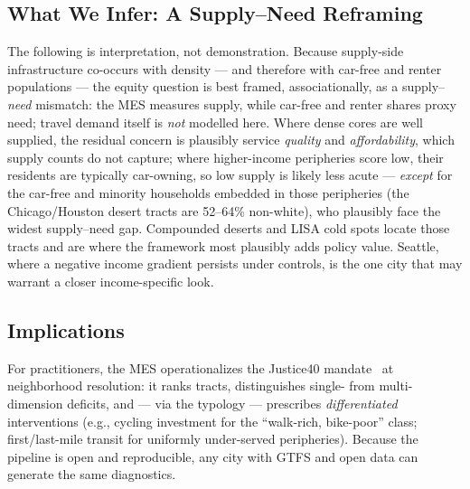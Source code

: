 \documentclass[11pt]{article}
\begin{document}
\subsection{What We Infer: A Supply--Need Reframing}
The following is interpretation, not demonstration. Because supply-side
infrastructure co-occurs with density --- and therefore with car-free and renter
populations --- the equity question is best framed, associationally, as a
supply--\emph{need} mismatch: the MES measures supply, while car-free and renter
shares proxy need; travel demand itself is \emph{not} modelled here. Where dense
cores are well supplied, the residual concern is plausibly service \emph{quality}
and \emph{affordability}, which supply counts do not capture; where higher-income
peripheries score low, their residents are typically car-owning, so low supply is
likely less acute --- \emph{except} for the car-free and minority households
embedded in those peripheries (the Chicago/Houston desert tracts are 52--64\%
non-white), who plausibly face the widest supply--need gap. Compounded deserts and
LISA cold spots locate those tracts and are where the framework most plausibly
adds policy value. Seattle, where a negative income gradient persists under
controls, is the one city that may warrant a closer income-specific look.

\subsection{Implications}
For practitioners, the MES operationalizes the Justice40 mandate~\cite{argonne2022}
at neighborhood resolution: it ranks tracts, distinguishes single- from
multi-dimension deficits, and --- via the typology --- prescribes
\emph{differentiated} interventions (e.g., cycling investment for the
``walk-rich, bike-poor'' class; first/last-mile transit for uniformly
under-served peripheries). Because the pipeline is open and reproducible, any city
with GTFS and open data can generate the same diagnostics.
\end{document}
